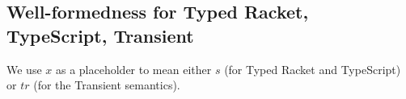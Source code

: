 \documentclass[acmlarge, anonymous, authordraft, review]{acmart} %
\begin{document}
\vspace{-3mm}
\begin{mathpar}



\end{mathpar}


\subsection{Well-formedness for Typed Racket, TypeScript, Transient}

We use $x$ as a placeholder to mean either $s$ (for Typed Racket and TypeScript) or $tr$ (for the Transient semantics). \\

\vspace{-5mm}
\begin{mathpar}
\end{mathpar}

\begin{mathpar}
\vspace{-3mm}
\end{mathpar}

\begin{mathpar}
\vspace{-4mm}

\end{mathpar}
\end{document}
